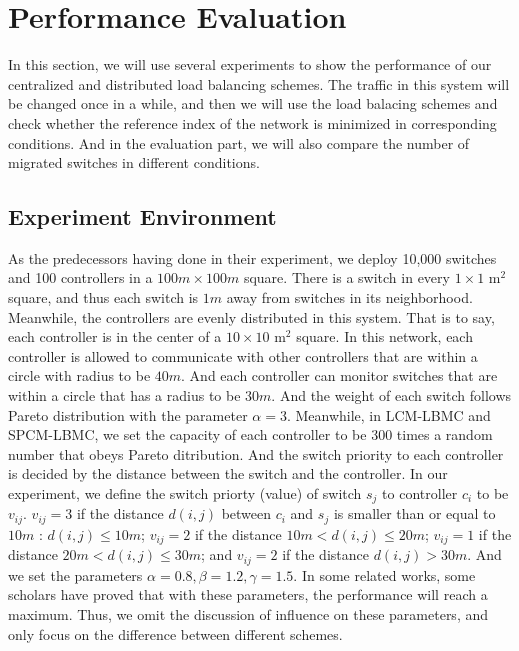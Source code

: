

\chapter{Performance Evaluation}
\label{chap:evaluation}

In this section, we will use several experiments to show the performance of our centralized and distributed load balancing schemes. The traffic in this system will be changed once in a while, and then we will use the load balacing schemes and check whether the reference index of the network is minimized in corresponding conditions. And in the evaluation part, we will also compare the number of migrated switches in different conditions.

\vspace{-5pt}
\section{Experiment Environment}

As the predecessors having done in their experiment, we deploy 10,000 switches and 100 controllers in a $100m \times 100m$ square. There is a switch in every $1 \times 1 \text{ m}^2$ square, and thus each switch is $1m$ away from switches in its neighborhood. Meanwhile, the controllers are evenly distributed in this system. That is to say, each controller is in the center of a $10 \times 10 \text{ m}^2$ square. In this network, each controller is allowed to communicate with other controllers that are within a circle with radius to be $40m$. And each controller can monitor switches that are within a circle that has a radius to be $30m$. And the weight of each switch follows Pareto distribution with the parameter $\alpha=3$. Meanwhile, in LCM-LBMC and SPCM-LBMC, we set the capacity of each controller to be 300 times a random number that obeys Pareto ditribution. And the switch priority to each controller is decided by the distance between the switch and the controller. In our experiment, we define the switch priorty (value) of switch $s_j$ to controller $c_i$ to be $v_{ij}$. $v_{ij}=3$ if the distance $d(i, j)$ between $c_i$ and $s_j$ is smaller than or equal to $10m$ : $d(i, j) \le 10m$; $v_{ij}=2$ if the distance $10m < d(i, j) \le 20m$; $v_{ij}=1$ if the distance $20m < d(i, j) \le 30m$; and $v_{ij}=2$ if the distance $d(i, j) > 30m$. And we set the parameters $\alpha = 0.8, \beta = 1.2, \gamma = 1.5$. In some related works, some scholars have proved that with these parameters, the performance will reach a maximum. Thus, we omit the discussion of influence on these parameters, and only focus on the difference between different schemes.

